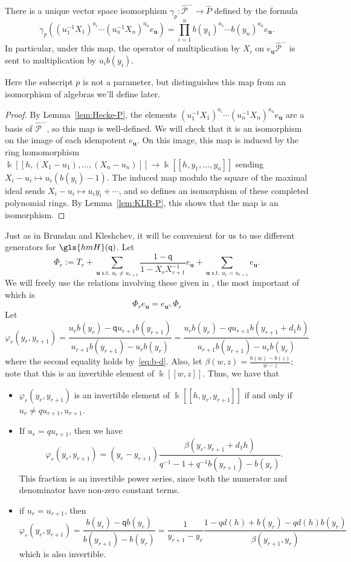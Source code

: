 \documentclass[ALCO,ThmDefs,Unicode,epreuves]{cedram}
\newcommand{\pq}{\mathsf{q}}
\newcommand{\K}{\Bbbk}%
\newcommand{\Bu}{\mathbf{u}}
\newcommand{\cP}{\mathcal{P}}
\newcommand{\hmH}{\gls{hmH}}
\newcommand{\hcP}{\widehat{\cP}}
\newcommand{\hP}{\widehat{P}}
\newcommand\llbracket{[\![}
\newcommand\rrbracket{]\!]}
\begin{document}
\begin{lemma}\label{lem:gammap}
 There is a unique 
vector space isomorphism $\gamma_p\colon \hcP^-\to \hP$ defined by the formula
\begin{equation}
 \gamma_p((u_1^{-1}X_1)^{a_i}\cdots (u_n^{-1}X_n)^{a_n}e_{\Bu})=
\prod_{i=1}^nb(y_1)^{a_1}\cdots b(y_n)^{a_n}e_{\Bu}.\label{eq:poly-map}
\end{equation}
 In particular, under this map, the operator of multiplication by $X_i$ on
 $e_{\Bu} \hcP^-$ is sent to multiplication by $u_ib(y_i)$. 
\end{lemma}Here the subscript $p$ is not a parameter, but
 distinguishes this map from an isomorphism of algebras we'll define
 later.
 \begin{proof}
 By Lemma~\ref{lem:Hecke-P}, the elements
 $(u_1^{-1}X_1)^{a_i}\cdots (u_n^{-1}X_n)^{a_n}e_{\Bu}$ are a basis
 of $\hcP^-$, so this map is well-defined. We will check that it
 is an isomorphism on the image of each idempotent $e_{\Bu}$. On
 this image, this map is induced by the ring homomorphism
 $\K\llbracket h,(X_1-u_1),\dots, (X_n-u_n)\rrbracket \to \K\llbracket h,y_1,\dots,y_n\rrbracket $
 sending $X_i-u_i\mapsto u_i(b(y_i)-1)$. The induced map modulo
 the square of the maximal ideal sends $X_i-u_i\mapsto
 u_iy_i+\cdots$, and so defines an isomorphism of these completed
 polynomial rings.
 By Lemma~\ref{lem:KLR-P}, this shows that
 the map is an isomorphism.
 \end{proof}
 Just as in Brundan and Kleshchev, it will be convenient for us to
 use different generators for $\hmH(\pq)$. Let \[\Phi_r:=
 T_r+\sum_{\Bu\text{ s.t. }u_r\neq
 u_{r+1}}\frac{1-\pq}{1-X_rX_{r+1}^{-1}}e_{\Bu}+\sum_{\Bu\text{ s.t. }u_r=
 u_{r+1}}e_{\Bu}.
 \]
We will freely use the relations involving these given in
\cite[Lem.~4.1]{BKKL}, the most important of which is 
\begin{equation}
\Phi_r e_{\Bu}=e_{\Bu^{s_r}}\Phi_r\label{eq:Phi-e}
\end{equation}
Let \[\varphi_r(y_r,y_{r+1})=\frac{u_rb(y_r)-\pq
 u_{r+1}b(y_{r+1})}{u_{r+1}b(y_{r+1}) -u_rb(y_r)}=\frac{u_rb(y_r)-q
 u_{r+1}b(y_{r+1}+d_1h)}{u_{r+1}b(y_{r+1}) -u_rb(y_r)} \]
where the second equality holds by~\eqref{eq:b-d}. Also, let
$\beta(w,z)=\frac{b(w)-b(z)}{w-z};$ note that this is an invertible
element of $\K\llbracket w,z\rrbracket $. 
Thus, we have that 
\begin{itemize}
\item $\varphi_r(y_r,y_{r+1})$ is an invertible element of 
 $\K\llbracket h,y_r,y_{r+1}\rrbracket $ if and only if $u_r\neq qu_{r+1},u_{r+1}$. 
\item If
 $u_r= qu_{r+1}$, then we have \[\varphi_r(y_r,y_{r+1})=(y_r-y_{r+1})\frac{\beta(y_r,y_{r+1}+d_1h)}{q^{-1} -1+q^{-1}b(y_{r+1}) -b(y_r)}.\]
 This fraction is an invertible power series, since both the numerator
 and denominator have non-zero constant terms.
\item if $u_r=u_{r+1}$,
 then \[\varphi_r(y_r,y_{r+1})=\frac{b(y_r)-\pq b(y_r)}{b(y_{r+1})
 -b(y_r)}=\frac{1}{y_{r+1}
 -y_r}\frac{1-qd(h)+b(y_r)-qd(h)b(y_r)}{\beta(y_{r+1} ,y_r)}\]
 which is also invertible. 
\end{itemize}
\end{document}
